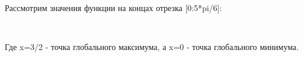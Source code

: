 \documentclass[russian,utf8,nocolumnxxxi,nocolumnxxxii]{eskdtext}
\begin{document}
\begin{figure}[H]
\begin{center}
\begin{minipage}[h]{0.65\linewidth}
  \\
\end{minipage}
\end{center}
\end{figure}

Рассмотрим значения функции на концах отрезка [0:5*pi/6]:

\begin{figure}[H]
\begin{center}
\begin{minipage}[h]{0.65\linewidth}
  \\
\end{minipage}
\end{center}
\end{figure}

Где x=3/2 - точка глобального максимума, а x=0 - точка глобального минимума. \\
\end{document}
